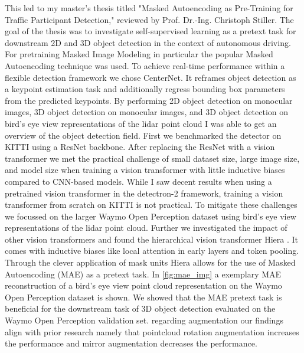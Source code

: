 \begin{minipage}[t]{504pt}
\begin{minipage}[t]{350pt}
This led to my master's thesis titled "Masked Autoencoding as Pre-Training for Traffic Participant Detection," 
reviewed by Prof. Dr.-Ing. Christoph Stiller.
The goal of the thesis was to investigate self-supervised learning as a pretext task for downstream 2D and 3D object detection in the context 
of autonomous driving. For pretraining Masked Image Modeling in particular the popular Masked Autoencoding \cite{mae} technique was used. To achieve real-time performance within a flexible detection framework we chose CenterNet. It reframes 
object detection as a keypoint estimation task and additionally regress bounding box parameters from the predicted keypoints.
By performing 2D object detection on monocular images, 3D object detection on monocular images, and 3D object detection on bird's eye view
representations of the  lidar point cloud I was able to get an overview of the object detection field.
First we benchmarked the detector on KITTI using a ResNet backbone. After replacing the ResNet with a vision transformer we met 
the practical challenge of small dataset size, large image size, and model size when training a vision transformer with little 
inductive biases compared to CNN-based models.
While I saw decent results when using a pretrained vision transformer in the detectron-2 framework,
training a vision transformer from scratch on KITTI is not practical.
To mitigate these challenges we focussed on the larger Waymo Open Perception dataset using 
bird's eye view representations of the lidar point cloud. Further we investigated the impact of other vision transformers and found 
the hierarchical vision transformer Hiera \cite{hiera}. It comes with inductive biases like local attention in early layers and 
token pooling. Through the clever application of mask units Hiera allows for 
the use of Masked Autoencoding (MAE) as a pretext task. In \autoref{fig:mae_img} a exemplary MAE reconstruction of a 
bird's eye view point cloud representation
on the Waymo Open Perception dataset is shown. We showed that the 
MAE pretext task is beneficial for the downstream task of 3D object detection evaluated on the Waymo Open Perception validation set. 
regarding augmentation our findings align with 
prior research namely that pointcloud rotation augmentation increases the performance and mirror augmentation decreases the performance.


\end{minipage}
\end{minipage}

